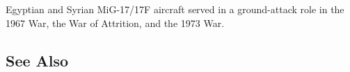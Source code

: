 Egyptian and Syrian MiG-17/17F aircraft served in a ground-attack role in the 1967 War, the War of Attrition, and the 1973 War.

\begin{adclist}
\end{adclist}

\subsection{See Also}
\begin{typelist}
\end{typelist}